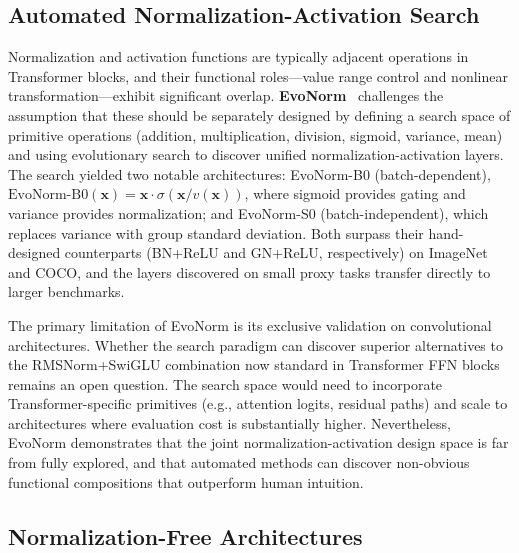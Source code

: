 \subsection{Automated Normalization-Activation Search}

Normalization and activation functions are typically adjacent operations in Transformer blocks, and their functional roles---value range control and nonlinear transformation---exhibit significant overlap.
\textbf{EvoNorm}~\cite{liu2020evolving} challenges the assumption that these should be separately designed by defining a search space of primitive operations (addition, multiplication, division, sigmoid, variance, mean) and using evolutionary search to discover unified normalization-activation layers.
The search yielded two notable architectures: EvoNorm-B0 (batch-dependent), $\text{EvoNorm-B0}(\mathbf{x}) = \mathbf{x} \cdot \sigma(\mathbf{x} / v(\mathbf{x}))$, where sigmoid provides gating and variance provides normalization; and EvoNorm-S0 (batch-independent), which replaces variance with group standard deviation.
Both surpass their hand-designed counterparts (BN+ReLU and GN+ReLU, respectively) on ImageNet and COCO, and the layers discovered on small proxy tasks transfer directly to larger benchmarks.

The primary limitation of EvoNorm is its exclusive validation on convolutional architectures.
Whether the search paradigm can discover superior alternatives to the RMSNorm+SwiGLU combination now standard in Transformer FFN blocks remains an open question.
The search space would need to incorporate Transformer-specific primitives (e.g., attention logits, residual paths) and scale to architectures where evaluation cost is substantially higher.
Nevertheless, EvoNorm demonstrates that the joint normalization-activation design space is far from fully explored, and that automated methods can discover non-obvious functional compositions that outperform human intuition.

\subsection{Normalization-Free Architectures}

